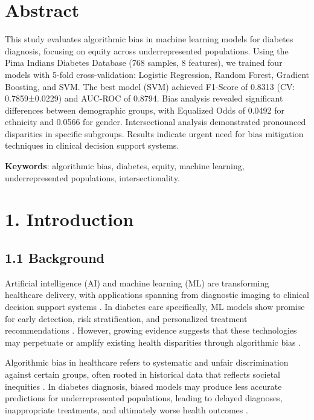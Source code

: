 \documentclass[12pt,a4paper]{article}
\begin{document}
\section*{Abstract}

This study evaluates algorithmic bias in machine learning models for diabetes 
diagnosis, focusing on equity across underrepresented populations. Using the 
Pima Indians Diabetes Database (768 samples, 8 features), we trained four 
models with 5-fold cross-validation: Logistic Regression, Random Forest, 
Gradient Boosting, and SVM. The best model (SVM) achieved F1-Score of 
0.8313 (CV: 0.7859±0.0229) and AUC-ROC of 0.8794. Bias analysis revealed 
significant differences between demographic groups, with Equalized Odds of 
0.0492 for ethnicity and 0.0566 for gender. Intersectional analysis 
demonstrated pronounced disparities in specific subgroups. Results indicate 
urgent need for bias mitigation techniques in clinical decision support 
systems.

\textbf{Keywords}: algorithmic bias, diabetes, equity, machine learning, 
underrepresented populations, intersectionality.

\section{1. Introduction}

\subsection{1.1 Background}

Artificial intelligence (AI) and machine learning (ML) are transforming 
healthcare delivery, with applications spanning from diagnostic imaging 
to clinical decision support systems \cite{topol2019}. In diabetes care 
specifically, ML models show promise for early detection, risk stratification, 
and personalized treatment recommendations \cite{sd2019}. However, growing 
evidence suggests that these technologies may perpetuate or amplify existing 
health disparities through algorithmic bias \cite{mehrabi2021}.

Algorithmic bias in healthcare refers to systematic and unfair discrimination 
against certain groups, often rooted in historical data that reflects societal 
inequities \cite{barocas2019}. In diabetes diagnosis, biased models may 
produce less accurate predictions for underrepresented populations, leading 
to delayed diagnoses, inappropriate treatments, and ultimately worse health 
outcomes \cite{obermeyer2019}.
\end{document}
